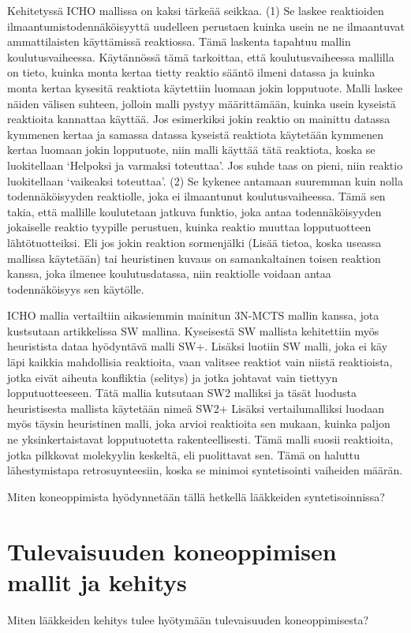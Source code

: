 \documentclass[finnish,twoside,censored,subject,sw-line]{HYthesisML}
\begin{document}
Kehitetyssä ICHO mallissa on kaksi tärkeää seikkaa.
(1) Se laskee reaktioiden ilmaantumistodennäköisyyttä uudelleen perustaen kuinka usein ne ne ilmaantuvat ammattilaisten käyttämissä reaktiossa.
Tämä laskenta tapahtuu mallin koulutusvaiheessa.
Käytännössä tämä tarkoittaa, että koulutusvaiheessa mallilla on tieto, kuinka monta kertaa tietty reaktio sääntö ilmeni datassa ja kuinka monta kertaa kysesitä reaktiota käytettiin luomaan jokin lopputuote.
Malli laskee näiden välisen suhteen, jolloin malli pystyy määrittämään, kuinka usein kyseistä reaktioita kannattaa käyttää.
Jos esimerkiksi jokin reaktio on mainittu datassa kymmenen kertaa ja samassa datassa kyseistä reaktiota käytetään kymmenen kertaa luomaan jokin lopputuote, niin malli käyttää tätä reaktiota, koska se luokitellaan `Helpoksi ja varmaksi toteuttaa'.
Jos suhde taas on pieni, niin reaktio luokitellaan `vaikeaksi toteuttaa'.
(2) Se kykenee antamaan suuremman kuin nolla todennäköisyyden reaktiolle, joka ei ilmaantunut koulutusvaiheessa.
Tämä sen takia, että mallille koulutetaan jatkuva funktio, joka antaa todennäköisyyden jokaiselle reaktio tyypille perustuen, kuinka reaktio muuttaa lopputuotteen lähtötuotteiksi.
Eli jos jokin reaktion sormenjälki (Lisää tietoa, koska useassa mallissa käytetään) tai heuristinen kuvaus on samankaltainen toisen reaktion kanssa, joka ilmenee koulutusdatassa, niin reaktiolle voidaan antaa todennäköisyys sen käytölle.

ICHO mallia vertailtiin aikasiemmin mainitun 3N-MCTS mallin kanssa, jota kustsutaan artikkelissa SW mallina.
Kyseisestä SW mallista kehitettiin myös heuristista dataa hyödyntävä malli SW+.
Lisäksi luotiin SW malli, joka ei käy läpi kaikkia mahdollisia reaktioita, vaan valitsee reaktiot vain niistä reaktioista, jotka eivät aiheuta konfliktia (selitys) ja jotka johtavat vain tiettyyn lopputuotteeseen.
Tätä mallia kutsutaan SW2 malliksi ja täsät luodusta heuristisesta mallista käytetään nimeä SW2+
Lisäksi vertailumalliksi luodaan myös täysin heuristinen malli, joka arvioi reaktioita sen mukaan, kuinka paljon ne yksinkertaistavat lopputuotetta rakenteellisesti.
Tämä malli suosii reaktioita, jotka pilkkovat molekyylin keskeltä, eli puolittavat sen.
Tämä on haluttu lähestymistapa retrosuynteesiin, koska se minimoi syntetisointi vaiheiden määrän.


Miten koneoppimista hyödynnetään tällä hetkellä lääkkeiden syntetisoinnissa?~\cite{SeglerMarwinHS2018Pcsw,ShaharHarelAndKiraRadinsky,ShinBonggun}

\chapter{Tulevaisuuden koneoppimisen mallit ja kehitys}

Miten lääkkeiden kehitys tulee hyötymään tulevaisuuden koneoppimisesta?~\cite{ButlerKeithT2018Mlfm}

\cleardoublepage                          %
{}  %
\printbibliography

\backmatter
\end{document}
